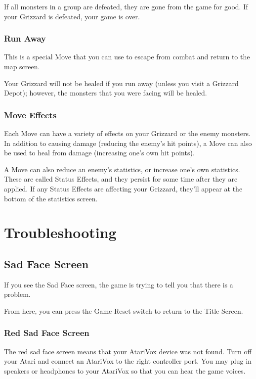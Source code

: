 \documentclass[12pt,twoside]{memoir}
\begin{document}
\begin{description}
If all  monsters in a  group are defeated, they  are gone from  the game
for good. If your Grizzard is defeated, your game is over.

\subsection{Run Away}

This is a special Move that you can use to escape from combat and return
to the map screen.

Your  Grizzard will  not be  healed if  you run  away (unless  you visit
a  Grizzard Depot);  however, the  monsters  that you  were facing  will
be healed.

\subsection{Move Effects}

Each  Move  can have  a  variety  of effects  on  your  Grizzard or  the
enemy monsters. In addition to  causing damage (reducing the enemy's hit
points), a Move  can also be used to heal  from damage (increasing one's
own hit points).

A Move  can also  reduce an  enemy's statistics,  or increase  one's own
statistics. These are  called Status Effects, and they  persist for some
time after  they are applied. If  any Status Effects are  affecting your
Grizzard, they'll appear at the bottom of the statistics screen.

\chapter{Troubleshooting}

\section{Sad Face Screen}

If you see the Sad Face screen, the game is trying to tell you that
there is a problem.

From here, you can press the Game Reset switch to return to the Title
Screen. 

\subsection{Red Sad Face Screen}

The red sad  face screen means that your AtariVox  device was not found. 
Turn off your Atari and connect an AtariVox to the right controller port. 
You may plug in speakers or headphones to your AtariVox so that you can hear
the game voices.


\end{description}
\end{document}
